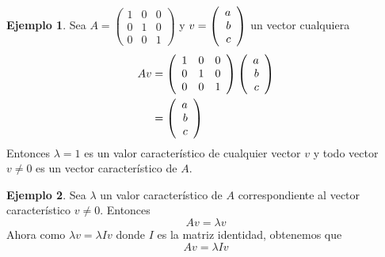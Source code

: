 \documentclass[10pt,a4paper]{report}
\newtheorem{theorem}{Teorema}[chapter]
\newtheorem{lemma}[theorem]{Lema}
\theoremstyle{definition}
\newtheorem{dfn}{Definición}[chapter]
\newtheorem{ejemplo}{Ejemplo}[chapter]
\newtheorem{ejercicio}{Ejercicio}[chapter]
\theoremstyle{remark}
\numberwithin{section}{chapter}
\numberwithin{equation}{chapter}
\numberwithin{tacounter}{chapter}
\begin{document}
\begin{ejemplo}
Sea $A = \left( \begin{array}{rrr}
1 & 0 & 0\\
0 & 1 & 0\\
0 & 0 & 1
\end{array} \right)$ y $v = \left( \begin{array}{r} a\\ b\\ c \end{array} \right) $ un vector cualquiera
\begin{align*}
Av &= \left( \begin{array}{rrr}
1 & 0 & 0\\
0 & 1 & 0\\
0 & 0 & 1
\end{array} \right) \left( \begin{array}{r} a\\ b\\ c \end{array} \right) \\
&= \left( \begin{array}{r} a\\ b\\ c \end{array} \right) 
\end{align*}
Entonces $\lambda = 1$ es un valor característico de cualquier vector $v$ y todo vector $v \neq 0$ es un vector característico de $A$.
\end{ejemplo}

\begin{ejemplo}
Sea $\lambda$ un valor característico de $A$ correspondiente al vector característico $v \neq 0$. Entonces 
$$Av = \lambda v$$
Ahora como $\lambda v = \lambda I v$ donde $I$ es la matriz identidad, obtenemos que 
$$Av = \lambda I v$$

\end{ejemplo}








%
%
%
%
%

\end{document}
